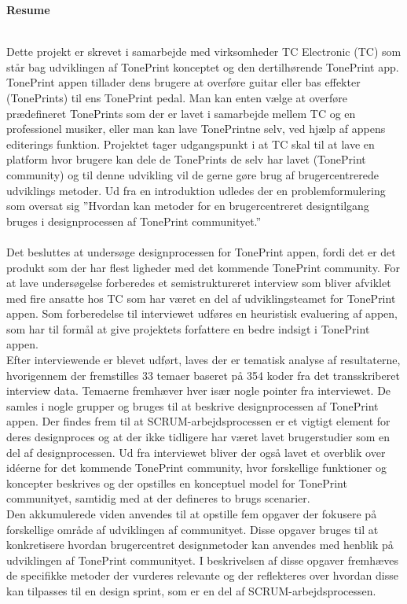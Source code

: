 \noindent
\begin{LARGE}
\textbf{Resume}
\end{LARGE}
\\
\noindent
Dette projekt er skrevet i samarbejde med virksomheder TC Electronic (TC) som står bag udviklingen af TonePrint konceptet og den dertilhørende TonePrint app. TonePrint appen tillader dens brugere at overføre guitar eller bas effekter (TonePrints) til ens TonePrint pedal. Man kan enten vælge at overføre prædefineret TonePrints som der er lavet i samarbejde mellem TC og en professionel musiker, eller man kan lave TonePrintne selv, ved hjælp af appens editerings funktion. Projektet tager udgangspunkt i at TC skal til at lave en platform hvor brugere kan dele de TonePrints de selv har lavet (TonePrint community) og til denne udvikling vil de gerne gøre brug af brugercentrerede udviklings metoder. Ud fra en introduktion udledes der en problemformulering som oversat sig ”Hvordan kan metoder for en brugercentreret designtilgang bruges i designprocessen af TonePrint communityet.” \\
\\
Det besluttes at undersøge designprocessen for TonePrint appen, fordi det er det produkt som der har flest ligheder med det kommende TonePrint community. For at lave undersøgelse forberedes et semistruktureret interview som bliver afviklet med fire ansatte hos TC som har været en del af udviklingsteamet for TonePrint appen. Som forberedelse til interviewet udføres en heuristisk evaluering af appen, som har til formål at give projektets forfattere en bedre indsigt i TonePrint appen. \\
Efter interviewende er blevet udført, laves der er tematisk analyse af resultaterne, hvorigennem der fremstilles 33 temaer baseret på 354 koder fra det transskriberet interview data. Temaerne fremhæver hver især nogle pointer fra interviewet. De samles i nogle grupper og bruges til at beskrive designprocessen af TonePrint appen. Der findes frem til at SCRUM-arbejdsprocessen er et vigtigt element for deres designproces og at der ikke tidligere har været lavet brugerstudier som en del af designprocessen. Ud fra interviewet bliver der også lavet et overblik over idéerne for det kommende TonePrint community, hvor forskellige funktioner og koncepter beskrives og der opstilles en konceptuel model for TonePrint communityet, samtidig med at der defineres to brugs scenarier. \\
Den akkumulerede viden anvendes til at opstille fem opgaver der fokusere på forskellige område af udviklingen af communityet. Disse opgaver bruges til at konkretisere hvordan brugercentret designmetoder kan anvendes med henblik på udviklingen af TonePrint communityet. I beskrivelsen af disse opgaver fremhæves de specifikke metoder der vurderes relevante og der reflekteres over hvordan disse kan tilpasses til en design sprint, som er en del af SCRUM-arbejdsprocessen. \\
